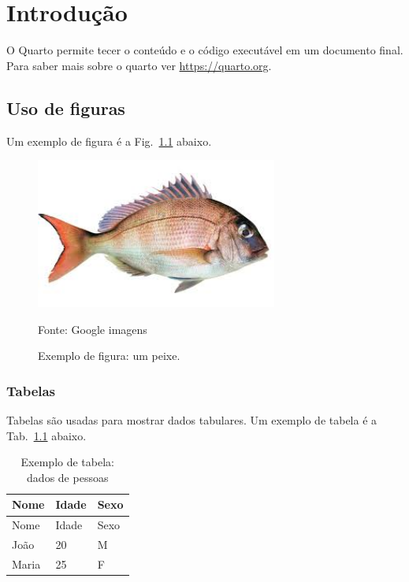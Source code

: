 \documentclass[
  12pt,
  oneside,
  a4paper,
  english,
  brazil]{abntex2}
\begin{document}
\mainmatter

\chapter{Introdução}

O Quarto permite tecer o conteúdo e o código executável em um documento
final. Para saber mais sobre o quarto ver \url{https://quarto.org}.

\section{Uso de figuras}\label{uso-de-figuras}

Um exemplo de figura é a Fig.~\ref{fig-peixe} abaixo.

\begin{figure}

\caption{\label{fig-peixe}Exemplo de figura: um peixe.}

\begin{minipage}{\linewidth}
\includegraphics[width=3.125in,height=\textheight,keepaspectratio]{figuras/images.jpg}\end{minipage}%
\newline
\begin{minipage}{\linewidth}
Fonte: Google imagens\end{minipage}%

\end{figure}%

\subsection{Tabelas}\label{tabelas}

Tabelas são usadas para mostrar dados tabulares. Um exemplo de tabela é
a Tab.~\ref{tbl-1} abaixo.

\begin{longtable}[]{@{}lll@{}}
\caption{Exemplo de tabela: dados de
pessoas}\label{tbl-1}\tabularnewline
\toprule\noalign{}
Nome & Idade & Sexo \\
\midrule\noalign{}
\endfirsthead
\toprule\noalign{}
Nome & Idade & Sexo \\
\midrule\noalign{}
\endhead
\bottomrule\noalign{}
\endlastfoot
João & 20 & M \\
Maria & 25 & F \\
\end{longtable}
\end{document}
